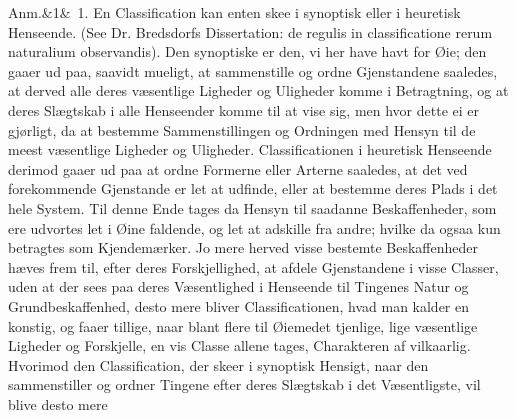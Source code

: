 \documentclass[12pt]{book}
\def\sperr#1{#1}%
\def\textit#1{#1}%
\def\emph#1{#1}%
\newcommand{\sperr}[1]{\textls[180]{#1}}
\newcommand{\anm}[1]{%
  \par\vspace{0.5\baselineskip}%
  \noindent\hspace{\parindent}\sperr{Anm.}\ifx&#1&\else~\textit{#1}.\fi
  \enspace\ignorespaces
}
\newcommand{\opage}[1]{\marginnote{\footnotesize\textit{[#1]}}}
\begin{document}
\anm{1} En Classification kan enten skee i \emph{synoptisk} eller i
\emph{heuretisk} Henseende. (See Dr. Bredsdorfs Dissertation: \textit{de regulis
in classificatione rerum naturalium observandis}). Den synoptiske er den, vi her
have havt for Øie; den gaaer ud paa, saavidt mueligt, at sammenstille
\opage{200} og ordne Gjenstandene saaledes, at derved alle deres væsentlige Ligheder og
Uligheder komme i Betragtning, og at deres Slægtskab i alle Henseender komme til
at vise sig, men hvor dette ei er gjørligt, da at bestemme Sammenstillingen og
Ordningen med Hensyn til de meest væsentlige Ligheder og Uligheder.
Classificationen i \emph{heuretisk} Henseende derimod gaaer ud paa at ordne
Formerne eller Arterne saaledes, at det ved forekommende Gjenstande er let at
udfinde, eller at bestemme deres Plads i det hele System. Til denne Ende tages da
Hensyn til saadanne Beskaffenheder, som ere udvortes let i Øine faldende, og let
at adskille fra andre; hvilke da ogsaa kun betragtes som \emph{Kjendemærker}. Jo
mere herved visse bestemte Beskaffenheder hæves frem til, efter deres
Forskjellighed, at afdele Gjenstandene i visse Classer, uden at der sees paa
deres Væsentlighed i Henseende til Tingenes Natur og Grundbeskaffenhed, desto
mere bliver Classificationen, hvad man kalder en \emph{konstig}, og faaer tillige,
naar blant flere til Øiemedet tjenlige, lige væsentlige Ligheder og Forskjelle,
en vis Classe allene tages, Charakteren af \emph{vilkaarlig}. Hvorimod den
Classification, der skeer i \emph{synoptisk} Hensigt, naar den sammenstiller og
ordner Tingene efter deres Slægtskab i det Væsentligste, vil blive desto mere
\end{document}
